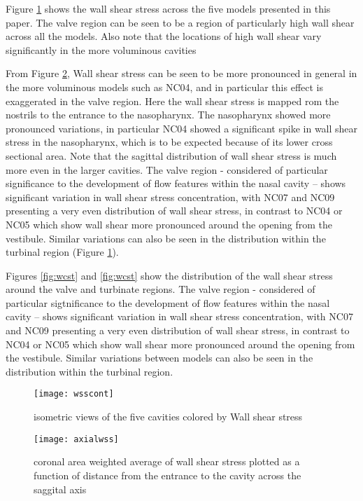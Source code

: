 Figure \ref{fig:wcont} shows the wall shear stress across the five models presented in this paper. The valve region can be seen to be a region of particularly high wall shear across all the models. Also note that the locations of high wall shear vary significantly in the more voluminous cavities


From Figure \ref{fig:wax}, Wall shear stress can be seen to be more pronounced in general in the more voluminous models such as NC04, and in particular this effect is exaggerated in the valve region. Here the wall shear stress is mapped rom the nostrils to the entrance to the nasopharynx. The nasopharynx showed more pronounced variations, in particular NC04 showed a significant spike in wall shear stress in the nasopharynx, which is to be expected because of its lower cross sectional area. Note that the sagittal distribution of wall shear stress is much more even in the larger cavities.  The valve region - considered of particular significance to the development of flow features within the nasal cavity \cite{Lindemann2008} – shows significant variation in wall shear stress concentration, with NC07 and NC09 presenting a very even distribution of wall shear stress, in contrast to NC04 or NC05 which show wall shear more pronounced around the opening from the vestibule. Similar variations can also be seen in the distribution within the turbinal region (Figure \ref{fig:wcont}). 

Figures \ref{fig:wcst} and \ref{fig:wcst} show the distribution of the wall shear stress around the valve and turbinate regions. The valve region - considered of particular sigtnificance to the development of flow features within the nasal cavity \cite{Lindemann2008} – shows significant variation in wall shear stress concentration, with NC07 and NC09 presenting a very even distribution of wall shear stress, in contrast to NC04 or NC05 which show wall shear more pronounced around the opening from the vestibule. Similar variations between models can also be seen in the distribution within the turbinal region. 

\begin{figure} \label{fig:wcont}
  \texttt{[image: wsscont]}
  \caption{isometric views of the five cavities colored by Wall shear stress}
\end{figure}

\begin{figure} \label{fig:wax}
  \texttt{[image: axialwss]}
  \caption{coronal area weighted average of wall shear stress plotted as a function of distance from the entrance to the cavity across the saggital axis}
\end{figure}

